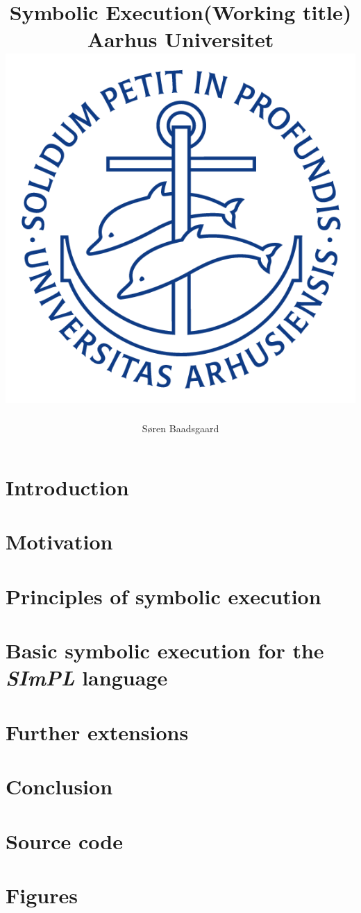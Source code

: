 \documentclass[]{report}
\title{
	\textbf{Symbolic Execution(Working title)}\\
	{\large Aarhus Universitet}\\
	{\includegraphics[scale=0.5]{ausegl_blaa.png}}	
	}
\author{Søren Baadsgaard}
\begin{document}
\maketitle

\begin{abstract}
\end{abstract}

\tableofcontents

\chapter{Introduction}
	
	
\chapter{Motivation}
	
\chapter{Principles of symbolic execution}
	

\chapter{Basic symbolic execution for the \emph{SImPL} language}
	
\chapter{Further extensions}

\chapter{Conclusion}
	

\appendix

\chapter{Source code}

\chapter{Figures}



\end{document}
